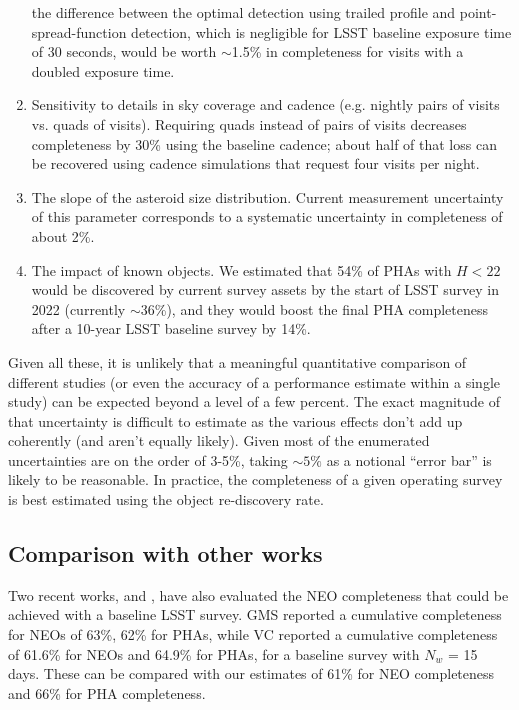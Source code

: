 \begin{enumerate}
          the difference between the optimal detection using trailed profile and point-spread-function
          detection, which is negligible for LSST baseline exposure time of 30 seconds, would be worth $\sim$1.5\%
          in completeness for visits with a doubled exposure time.
\item Sensitivity to details in sky coverage and cadence (e.g. nightly pairs of visits vs. quads of visits).
          Requiring quads instead of pairs of visits decreases completeness by 30\% using the baseline cadence;
          about half of that loss can be recovered using cadence simulations that request four visits per night.
\item The slope of the asteroid size distribution. Current measurement uncertainty of this parameter
          corresponds to a systematic uncertainty in completeness of about 2\%.
\item The impact of known objects. We estimated that 54\% of PHAs with $H<22$ would be discovered
          by current survey assets by the start of LSST survey in 2022 (currently $\sim$36\%), and they would
          boost the final PHA completeness after a 10-year LSST baseline survey by 14\%.
\end{enumerate}

Given all these, it is unlikely that a meaningful quantitative comparison of different studies (or even the accuracy of a performance estimate within a single study) can be expected beyond a level of a few percent. The exact magnitude of that uncertainty is difficult to estimate as the various effects don't add up coherently (and aren't equally likely). Given most of the enumerated uncertainties are on the order of 3-5\%, taking $\sim 5\%$ as a notional ``error bar'' is likely to be reasonable. In practice, the completeness of a given operating survey is best estimated using the object re-discovery rate.

\subsection{Comparison with other works  \label{sec:other}}

Two recent works, \citet*[][hereafter GMS]{GMS2016} and \citet*[][hereafter VC]{VeresChesley2017neo}, 
have also evaluated the NEO completeness that could be achieved with a baseline LSST survey.
GMS reported a cumulative completeness for NEOs of 63\%, 62\% for PHAs,
while VC reported a cumulative completeness of 61.6\%  for NEOs and 64.9\% for PHAs, 
for a baseline survey with $N_w$ = 15 days. These can be compared with our estimates of 61\% for NEO completeness
and 66\% for PHA completeness.

